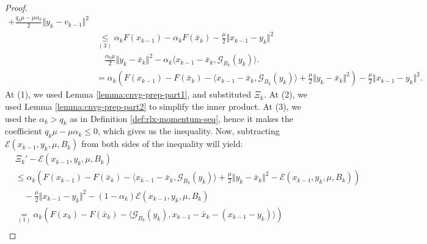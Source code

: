 \documentclass[12pt]{article}
\begin{document}
\begin{proof}
{\begin{align*}
                    + \frac{q_k\mu - \mu\alpha_k}{2}\Vert y_k - v_{k - 1} \Vert^2
                \\
                &\underset{(3)}{\le} 
                \alpha_kF(x_{k - 1}) - \alpha_k F(\bar x_k)
                - \frac{\mu}{2}\Vert x_{k - 1} - y_k\Vert^2 
                    \\&\quad 
                    \frac{\alpha_k\mu}{2}\Vert y_k - \bar x_k\Vert^2
                    - \alpha_k\langle
                        x_{k - 1} - \bar x_k, 
                        \mathcal G_{B_k}(y_k)
                    \rangle. 
                \\
                &= \alpha_k\left(
                    F(x_{k  - 1}) - F(\bar x_k) 
                    - \langle x_{k - 1} - \bar x_k, \mathcal G_{B_k}(y_k)\rangle
                    +  \frac{\mu}{2}\Vert y_k - \bar x_k\Vert^2
                \right)
                - \frac{\mu}{2}\Vert x_{k - 1} - y_k\Vert^2. 
            \end{align*}
            }
            At (1), we used Lemma \ref{lemma:cnvg-prep-part1}, and substituted $\Xi_k$. 
            At (2), we used Lemma \ref{lemma:cnvg-prep-part2} to simplify the inner product. 
            At (3), we used the $\alpha_k > q_k$ as in Definition \ref{def:rlx-momentum-seq}, hence it makes the coefficient $q_k \mu - \mu\alpha_k \le 0$, which gives us the inequality. 
            Now, subtracting $\mathcal E(x_{k - 1}, y_k, \mu, B_k)$ from both sides of the inequality will yield: 
            {\allowdisplaybreaks\small
            \begin{align*}
                & \Xi_k' - \mathcal E(x_{k - 1}, y_k, \mu, B_k)
                \\
                &\le 
                \alpha_k\left(
                    F(x_{k  - 1}) - F(\bar x_k) 
                    - \langle x_{k - 1} - \bar x_k, \mathcal G_{B_k}(y_k)\rangle
                    +  \frac{\mu}{2}\Vert y_k - \bar x_k\Vert^2
                    - \mathcal E(x_{k - 1}, y_k, \mu, B_k)
                \right)
                    \\ &\quad 
                    - \frac{\mu}{2}\Vert x_{k - 1} - y_k\Vert^2
                    - (1 - \alpha_k)\mathcal E(x_{k - 1}, y_k, \mu, B_k)
                \\
                &\underset{(1)}{=} 
                \alpha_k\left(
                    F(x_k) - F(\bar x_k) 
                    - \langle \mathcal G_{B_k}(y_k), x_{k - 1} - \bar x_k - (x_{k - 1} - y_k)\rangle
                \right)
                    \\&\quad 

\end{align*}}
\end{proof}
\end{document}
